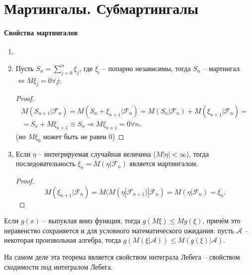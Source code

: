 \section{Мартингалы. Субмартингалы}


\paragraph{Свойства мартингалов}

\begin{enumerate}
  \item %

  \item Пусть $S_n = \sum_{j=0}^n \xi_j$, где $\xi_i$ -- попарно независимы,
    тогда $S_n$ -- мартингал $\Leftrightarrow M\xi_j = 0 \forall j$;
    \begin{proof}
      \begin{multline*}
        M(S_{n+1} | \mathcal{F}_n) = M(S_n + \xi_{n+1} | \mathcal{F}_n)
        = M(S_n | \mathcal{F}_n) + M(\xi_{n+1} | \mathcal{F}_n) = \\
        = S_n + M\xi_{n+1} \equiv S_n \Rightarrow M\xi_{n+1} = 0 \forall n.
      \end{multline*}
      (но $M\xi_0$ может быть не равен $0$)
    \end{proof}

  \item Если $\eta$ -- интегрируемая случайная величина ($M|\eta| < \infty$), тогда
    последовательность $\xi_n = M( \eta | \mathcal{F}_n )$ является мартингалом.
    \begin{proof}
      \[
        M(\xi_{n+1} | \mathcal{F}_n) = M( M(\eta | \mathcal{F}_{n+1}) | \mathcal{F}_n )
        = M(\eta | \mathcal{F}_n) = \xi_n.
      \]
    \end{proof}
\end{enumerate}

\begin{theorem}
  Если $g(x)$ -- выпуклая вниз функция, тогда $g(M\xi) \leqslant Mg(\xi)$, причём
  это неравенство сохраняется и для условного математического ожидания:
  пусть $\mathcal{A}$ -- некоторая произвольная алгебра, тогда
  $g(M(\xi|\mathcal{A})) \leqslant M(g(\xi) | \mathcal{A})$.

  На самом деле эта теорема является свойством интеграла Лебега -- свойством
  сходимости под интегралом Лебега.
\end{theorem}


